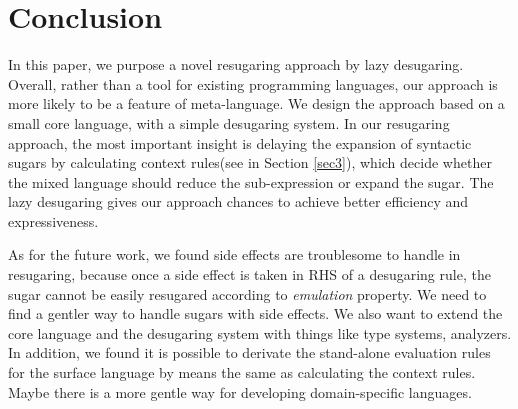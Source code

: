 \section{Conclusion}
\label{sec7}


In this paper, we purpose a novel resugaring approach by lazy desugaring.
Overall, rather than a tool for existing programming languages, our approach is more likely to be a feature of meta-language. We design the approach based on a small core language, with a simple desugaring system.
In our resugaring approach, the most important insight is delaying the expansion of syntactic sugars by calculating context rules(see in Section \ref{sec3}), which decide whether the mixed language should reduce the sub-expression or expand the sugar. The lazy desugaring gives our approach chances to achieve better efficiency and expressiveness.



As for the future work, we found side effects are troublesome to handle in resugaring, because once a side effect is taken in RHS of a desugaring rule, the sugar cannot be easily resugared according to \emph{emulation} property. We need to find a gentler way to handle sugars with side effects. We also want to extend the core language and the desugaring system with things like type systems, analyzers. In addition, we found it is possible to derivate the stand-alone evaluation rules for the surface language by means the same as calculating the context rules. Maybe there is a more gentle way for developing domain-specific languages.
